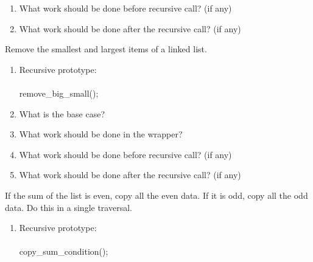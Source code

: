 \documentclass[../../main.tex]{subfiles}
\begin{document}
\begin{steps}
\begin{enumerate}[label=\Alph*.]
            \vspace{.5cm}
         \item What work should be done before recursive call? (if any)\\
            \vspace{.5cm}
         \item What work should be done after the recursive call? (if any)\\
            \vspace{.5cm}
      \end{enumerate}
   \item Remove the smallest and largest items of a linked list.
      \begin{enumerate}[label=\Alph*.]
         \item Recursive prototype:\\
            \vspace{.5cm}\\
            \underline{\hspace{4cm}}remove_big_small(\underline{\hspace{4cm}});
         \item What is the base case?\\
            \vspace{.5cm}
         \item What work should be done in the wrapper?\\
            \vspace{.5cm}
         \item What work should be done before recursive call? (if any)\\
            \vspace{.5cm}
         \item What work should be done after the recursive call? (if any)\\
            \vspace{.5cm}
      \end{enumerate}
   \item If the sum of the list is even, copy all the even data. If it is odd, copy all
      the odd data. Do this in a single traversal.
      \begin{enumerate}[label=\Alph*.]
         \item Recursive prototype:\\
            \vspace{.5cm}\\
            \underline{\hspace{4cm}}copy_sum_condition(\underline{\hspace{4cm}});

\end{enumerate}
\end{steps}
\end{document}

